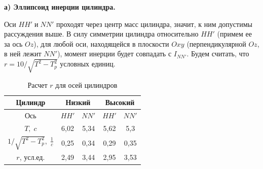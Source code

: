 \documentclass[a4paper, 12pt]{article}
\begin{document}
        \textbf{а) Эллипсоид инерции цилиндра.}

        Оси $HH'\;и\;NN'$ проходят через центр масс цилиндра, значит, к ним допустимы рассуждения выше. В силу симметрии цилиндра относительно $HH'$ (примем ее за ось $Oz$), для любой оси, находящейся в плоскости $Oxy$ (перпендикулярной $Oz$, в ней лежит $NN'$), момент инерции будет совпадать с $I_{NN'}$. Будем считать, что $r = 10/\sqrt{T^2-T_p^2}$ условных единиц.

        \begin{table}[h]
            \centering
            \caption{Расчет $r$ для осей цилиндров}
            \begin{tabular}{|c|cc|cc|}
                \hline
                Цилиндр                            & 
                \multicolumn{2}{c|}{Низкий}        & 
                \multicolumn{2}{c|}{Высокий}       \\ 
                \hline
                Ось                                & 
                \multicolumn{1}{c|}{$HH'$} & $NN'$ & 
                \multicolumn{1}{c|}{$HH'$} & $NN'$ \\ 
                \hline
                $T,\;c$                            & 
                \multicolumn{1}{c|}{6,02}  & 5,34  & 
                \multicolumn{1}{c|}{5,62}  & 5,3   \\ 
                \hline
                $1/\sqrt{T^2-T^2_p},\;\frac{1}{c}$ & 
                \multicolumn{1}{c|}{0,25}  & 0,34  & 
                \multicolumn{1}{c|}{0,29}  & 0,35  \\ 
                \hline
                $r$, усл.ед.                       & 
                \multicolumn{1}{c|}{2,49}  & 3,44  & 
                \multicolumn{1}{c|}{2,95}  & 3,53  \\ 
                \hline
            \end{tabular}
        \end{table}

        
\end{document}
